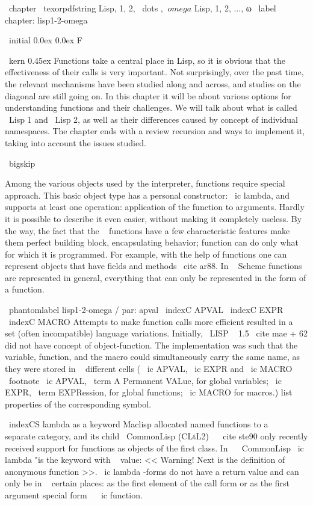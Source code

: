 \ chapter { \ texorpdfstring {Lisp, 1, 2, \ dots , $ \ omega $ } {Lisp, 1, 2, ..., ω}} %
\ label {chapter: lisp1-2-omega}

\ initial {0.0ex} {0.0ex} {F} { \ kern 0.45ex Functions take a central place
in Lisp, so it is obvious that the effectiveness of their calls is very important.
Not surprisingly, over the past time, the relevant mechanisms have been studied
along and across, and studies on the diagonal are still going on. In this chapter
it will be about various options for understanding functions and their challenges. We will talk
about what is called \ Lisp 1 and \ Lisp 2, as well as their differences caused by
concept of individual namespaces. The chapter ends with a review
recursion and ways to implement it, taking into account the issues studied.

\ bigskip

Among the various objects used by the interpreter, functions require
special approach. This basic object type has a personal constructor:
\ ic {lambda}, and supports at least one operation: application of the function
to arguments. Hardly it is possible to describe it even easier, without making it completely useless.
By the way, the fact that the ~ functions have a few characteristic features make them perfect
building block, encapsulating behavior; function can do only what
for which it is programmed. For example, with the help of functions one can represent
objects that have fields and methods \ cite {ar88}. In ~ Scheme functions are represented
in general, everything that can only be represented in the form of a function.

\ phantomlabel {lisp1-2-omega / par: apval}
\ indexC {APVAL} \ indexC {EXPR} \ indexC {MACRO}
Attempts to make function calls more efficient resulted in a ~ set (often
incompatible) language variations. Initially, \ LISP ~ 1.5 \ cite {mae + 62} did not have
concept of object-function. The implementation was such that the variable, function, and
the macro could simultaneously carry the same name, as they were stored in ~ different
cells ( \ ic {APVAL}, \ ic {EXPR} and \ ic {MACRO} \ footnote { \ ic {APVAL},
\ term {A Permanent VALue}, for global variables; \ ic {EXPR},
\ term {EXPRession}, for global functions; \ ic {MACRO} for macros.}) list
properties of the corresponding symbol.

\ indexCS {lambda} {as a keyword}
Maclisp allocated named functions to a ~ separate category, and its child
{ \ CommonLisp } (CLtL2) ~ \ cite {ste90} only recently received support for functions as
objects of the first class. In ~ { \ CommonLisp } \ ic {lambda} "is the keyword
with ~ value: << Warning! Next is the definition of anonymous function >>.
\ ic {lambda} -forms do not have a return value and can only be
in ~ certain places: as the first element of the call form or as the first argument
special form ~ \ ic {function}.

}
